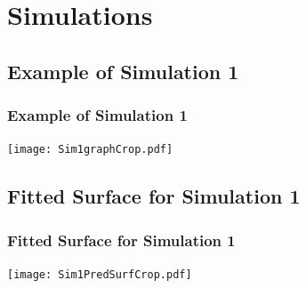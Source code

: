 \documentclass[mathserif,compress]{beamer}
\begin{document}

\section{Simulations}


\subsection{Example of Simulation 1}
\begin{frame}
\frametitle{Example of Simulation 1}

	\begin{center} 
		\texttt{[image: Sim1graphCrop.pdf]} 
	\end{center}

\end{frame}


\subsection{Fitted Surface for Simulation 1}
\begin{frame}
\frametitle{Fitted Surface for Simulation 1}

	\begin{center} 
		\texttt{[image: Sim1PredSurfCrop.pdf]} 
	\end{center}

\end{frame}

\end{document}
